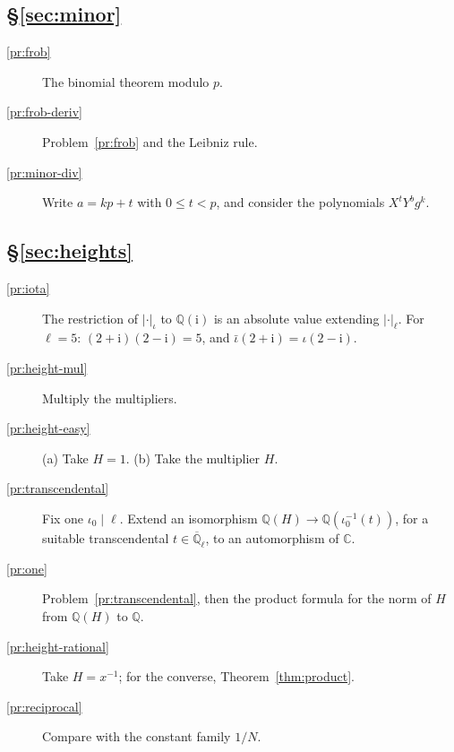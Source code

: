 \documentclass[reqno]{amsart}
\theoremstyle{definition}
\theoremstyle{plain}
\newcommand{\Q}{\mathbb{Q}}
\newcommand{\C}{\mathbb{C}}
\newcommand{\ii}{\mathrm{i}}
\newcommand{\Qlb}{\overline{\Q}_\ell}
\begin{document}
\subsection*{\S\ref{sec:minor}}
\begin{description}
\item[\ref{pr:frob}] The binomial theorem modulo \(p\).
\item[\ref{pr:frob-deriv}] Problem~\ref{pr:frob} and the Leibniz rule.
\item[\ref{pr:minor-div}] Write \(a = kp + t\) with \(0 \le t < p\), and consider the polynomials \(X^tY^bg^k\).
\end{description}

\subsection*{\S\ref{sec:heights}}
\begin{description}
\item[\ref{pr:iota}] The restriction of \(\lvert\cdot\rvert_\iota\) to \(\Q(\ii)\) is an absolute value extending \(\lvert\cdot\rvert_\ell\).  For \(\ell = 5\): \((2+\ii)(2-\ii) = 5\), and \(\bar\iota(2+\ii) = \iota(2-\ii)\).
\item[\ref{pr:height-mul}] Multiply the multipliers.
\item[\ref{pr:height-easy}] (a) Take \(H = 1\).  (b) Take the multiplier \(H\).
\item[\ref{pr:transcendental}] Fix one \(\iota_0 \mid \ell\).  Extend an isomorphism \(\Q(H) \to \Q(\iota_0^{-1}(t))\), for a suitable transcendental \(t \in \Qlb\), to an automorphism of \(\C\).
\item[\ref{pr:one}] Problem~\ref{pr:transcendental}, then the product formula for the norm of \(H\) from \(\Q(H)\) to \(\Q\).
\item[\ref{pr:height-rational}] Take \(H = x^{-1}\); for the converse, Theorem~\ref{thm:product}.
\item[\ref{pr:reciprocal}] Compare with the constant family \(1/N\).
\end{description}
\end{document}
